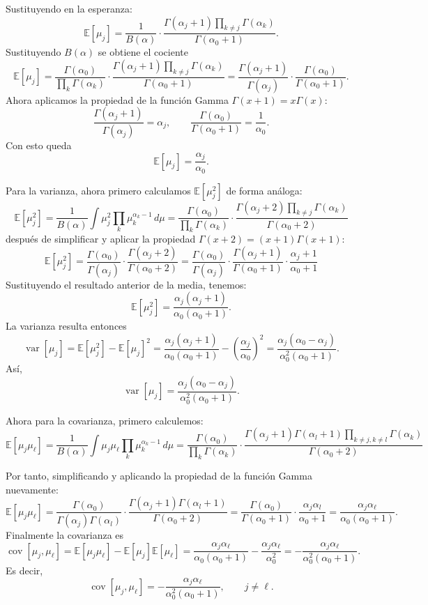\documentclass{article}
\begin{document}
Sustituyendo en la esperanza:
\[
\mathbb{E}[\mu_j]
=\frac{1}{B(\alpha)}\cdot
\frac{\Gamma(\alpha_j+1)\prod_{k\neq j}\Gamma(\alpha_k)}{\Gamma(\alpha_0+1)}.
\]
Sustituyendo \(B(\alpha)\) se obtiene el cociente
\[
\mathbb{E}[\mu_j]
=\frac{\Gamma(\alpha_0)}{\prod_k\Gamma(\alpha_k)}\cdot
\frac{\Gamma(\alpha_j+1)\prod_{k\neq j}\Gamma(\alpha_k)}{\Gamma(\alpha_0+1)}
= \frac{\Gamma(\alpha_j+1)}{\Gamma(\alpha_j)}\cdot
\frac{\Gamma(\alpha_0)}{\Gamma(\alpha_0+1)}.
\]
Ahora aplicamos la propiedad de la función Gamma
\(\Gamma(x+1)=x\Gamma(x)\):
\[
\frac{\Gamma(\alpha_j+1)}{\Gamma(\alpha_j)}=\alpha_j,\qquad
\frac{\Gamma(\alpha_0)}{\Gamma(\alpha_0+1)}=\frac{1}{\alpha_0}.
\]
Con esto queda
\[
\boxed{\displaystyle \mathbb{E}[\mu_j]=\frac{\alpha_j}{\alpha_0}.}
\]

Para la varianza, ahora primero calculamos \(\mathbb{E}[\mu_j^2]\) de forma análoga:
\[
\mathbb{E}[\mu_j^2]
=\frac{1}{B(\alpha)}\int \mu_j^2\prod_{k} \mu_k^{\alpha_k-1}\,d\mu
=\frac{\Gamma(\alpha_0)}{\prod_k\Gamma(\alpha_k)}\cdot
\frac{\Gamma(\alpha_j+2)\prod_{k\neq j}\Gamma(\alpha_k)}{\Gamma(\alpha_0+2)}
\]
después de simplificar y aplicar la propiedad \(\Gamma(x+2)=(x+1)\Gamma(x+1)\):
\[
\mathbb{E}[\mu_j^2]
=\frac{\Gamma(\alpha_0)}{\Gamma(\alpha_j)}\cdot
\frac{\Gamma(\alpha_j+2)}{\Gamma(\alpha_0+2)}
=\frac{\Gamma(\alpha_0)}{\Gamma(\alpha_j)}\cdot
\frac{\Gamma(\alpha_j+1)}{\Gamma(\alpha_0+1)}\cdot
\frac{\alpha_j+1}{\alpha_0+1}
\]
Sustituyendo el resultado anterior de la media, tenemos:
\[
\mathbb{E}[\mu_j^2]
=\frac{\alpha_j(\alpha_j+1)}{\alpha_0(\alpha_0+1)}.
\]
La varianza resulta entonces
\[
\operatorname{var}[\mu_j]
=\mathbb{E}[\mu_j^2]-\mathbb{E}[\mu_j]^2
=\frac{\alpha_j(\alpha_j+1)}{\alpha_0(\alpha_0+1)}-\left(\frac{\alpha_j}{\alpha_0}\right)^2
=\frac{\alpha_j(\alpha_0-\alpha_j)}{\alpha_0^2(\alpha_0+1)}.
\]
Así,
\[
\boxed{\displaystyle \operatorname{var}[\mu_j]=\frac{\alpha_j(\alpha_0-\alpha_j)}{\alpha_0^2(\alpha_0+1)}.}
\]

Ahora para la covarianza, primero calculemos:
\[
\mathbb{E}[\mu_j\mu_\ell]
=\frac{1}{B(\alpha)}\int\mu_j\mu_\ell\prod_k\mu_k^{\alpha_k-1}\,d\mu
=\frac{\Gamma(\alpha_0)}{\prod_k\Gamma(\alpha_k)}\cdot
\frac{\Gamma(\alpha_j+1)\Gamma(\alpha_l+1)\prod_{k\neq j, k \neq l}\Gamma(\alpha_k)}{\Gamma(\alpha_0+2)}
\]

Por tanto, simplificando y aplicando la propiedad de la función Gamma nuevamente:
\[
\mathbb{E}[\mu_j\mu_\ell]
=\frac{\Gamma(\alpha_0)}{\Gamma(\alpha_j)\Gamma(\alpha_l)}\cdot
\frac{\Gamma(\alpha_j+1)\Gamma(\alpha_l+1)}{\Gamma(\alpha_0+2)}
=\frac{\Gamma(\alpha_0)}{\Gamma(\alpha_0+1)}\cdot
\frac{\alpha_j \alpha_l}{\alpha_0+1}
=\frac{\alpha_j\alpha_\ell}{\alpha_0(\alpha_0+1)}.
\]
Finalmente la covarianza es
\[
\operatorname{cov}[\mu_j,\mu_\ell]
=\mathbb{E}[\mu_j\mu_\ell]-\mathbb{E}[\mu_j]\mathbb{E}[\mu_\ell]
=\frac{\alpha_j\alpha_\ell}{\alpha_0(\alpha_0+1)}
-\frac{\alpha_j\alpha_\ell}{\alpha_0^2}
=-\frac{\alpha_j\alpha_\ell}{\alpha_0^2(\alpha_0+1)}.
\]
Es decir,
\[
\boxed{\displaystyle \operatorname{cov}[\mu_j,\mu_\ell]
=-\frac{\alpha_j\alpha_\ell}{\alpha_0^2(\alpha_0+1)},\qquad j\neq\ell.}
\]
\end{document}
